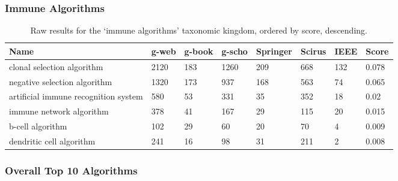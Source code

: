 \documentclass[a4paper, 11pt]{article}
\begin{document}
\subsubsection{Immune Algorithms}

\begin{table}[ht]
	\centering\footnotesize
		\begin{tabularx}{\textwidth}{Xlllllll}
		\toprule
		\textbf{Name} & \textbf{g-web} & \textbf{g-book} & \textbf{g-scho} & \textbf{Springer} & \textbf{Scirus} & \textbf{IEEE} & \textbf{Score} \\ 
		\toprule
		clonal selection algorithm & 2120 & 183 & 1260 & 209 & 668 & 132 & 0.078 \\
		negative selection algorithm & 1320 & 173 & 937 & 168 & 563 & 74 & 0.065 \\
		artificial immune recognition system & 580 & 53 & 331 & 35 & 352 & 18 & 0.02 \\
		immune network algorithm & 378 & 41 & 167 & 29 & 115 & 20 & 0.015 \\
		b-cell algorithm & 102 & 29 & 60 & 20 & 70 & 4 & 0.009 \\
		dendritic cell algorithm & 241 & 16 & 98 & 31 & 211 & 2 & 0.008 \\
		\bottomrule
		\end{tabularx}	
	\caption{Raw results for the `immune algorithms' taxonomic kingdom, ordered by score, descending.}
	\label{tab:immune}
\end{table}



\subsubsection{Overall Top 10 Algorithms}
\end{document}
